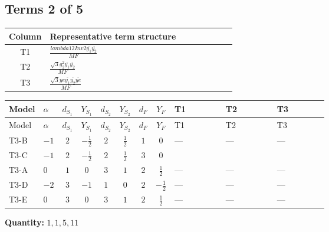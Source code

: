 \documentclass[8pt]{article}
\begin{document}
\begin{landscape}
\subsection*{Terms 2 of 5}
\begin{center}
\begin{tabular}{@{}c >{\raggedright\arraybackslash}p{0.82\linewidth}@{}}
\toprule
Column & Representative term structure \\
\midrule
T1 & \(\displaystyle \frac{lambda12Inv2 \overline{y_{1}} \overline{y_{2}}}{MF}\) \\
\midrule
T2 & \(\displaystyle \frac{\sqrt{3} g_{2}^{2} \overline{y_{1}} \overline{y_{2}}}{MF}\) \\
\midrule
T3 & \(\displaystyle \frac{\sqrt{3} ye \overline{y_{1}} \overline{y_{2}} \overline{ye}}{MF}\) \\
\midrule
\bottomrule
\end{tabular}
\end{center}
\smallskip
\tiny
\begin{longtable}{@{}llcccccc >{\raggedright\arraybackslash}p{0.21\linewidth} >{\raggedright\arraybackslash}p{0.21\linewidth} >{\raggedright\arraybackslash}p{0.21\linewidth}@{}}
\toprule
Model & $\alpha$ & $d_{S_1}$ & $Y_{S_1}$ & $d_{S_2}$ & $Y_{S_2}$ & $d_F$ & $Y_F$ & T1 & T2 & T3 \\
\midrule
\endfirsthead
\toprule
Model & $\alpha$ & $d_{S_1}$ & $Y_{S_1}$ & $d_{S_2}$ & $Y_{S_2}$ & $d_F$ & $Y_F$ & T1 & T2 & T3 \\
\midrule
\endhead
T3-B & $-1$ & $2$ & $-\frac{1}{2}$ & $2$ & $\frac{1}{2}$ & $1$ & $0$ & --- & --- & --- \\
\midrule
T3-C & $-1$ & $2$ & $-\frac{1}{2}$ & $2$ & $\frac{1}{2}$ & $3$ & $0$ & \scriptsize\adjustbox{max width=\linewidth}{$\begin{gathered} \frac{lambda12Inv2 \overline{y_{1}} \overline{y_{2}}}{3 MF}\end{gathered}$} & \scriptsize\adjustbox{max width=\linewidth}{$\begin{gathered} \frac{\sqrt{3} g_{2}^{2} \overline{y_{1}} \overline{y_{2}}}{4 MF}\end{gathered}$} & \scriptsize\adjustbox{max width=\linewidth}{$\begin{gathered} - \frac{\sqrt{3} ye \overline{y_{1}} \overline{y_{2}} \overline{ye}}{12 MF}\end{gathered}$} \\
\midrule
T3-A & $0$ & $1$ & $0$ & $3$ & $1$ & $2$ & $\frac{1}{2}$ & --- & --- & --- \\
\midrule
T3-D & $-2$ & $3$ & $-1$ & $1$ & $0$ & $2$ & $-\frac{1}{2}$ & --- & --- & --- \\
\midrule
T3-E & $0$ & $3$ & $0$ & $3$ & $1$ & $2$ & $\frac{1}{2}$ & --- & --- & --- \\
\midrule
\bottomrule
\end{longtable}
\clearpage
\noindent\textbf{Quantity: }$\mathrm{1,1,5,11}$\par\smallskip

\end{landscape}
\end{document}
